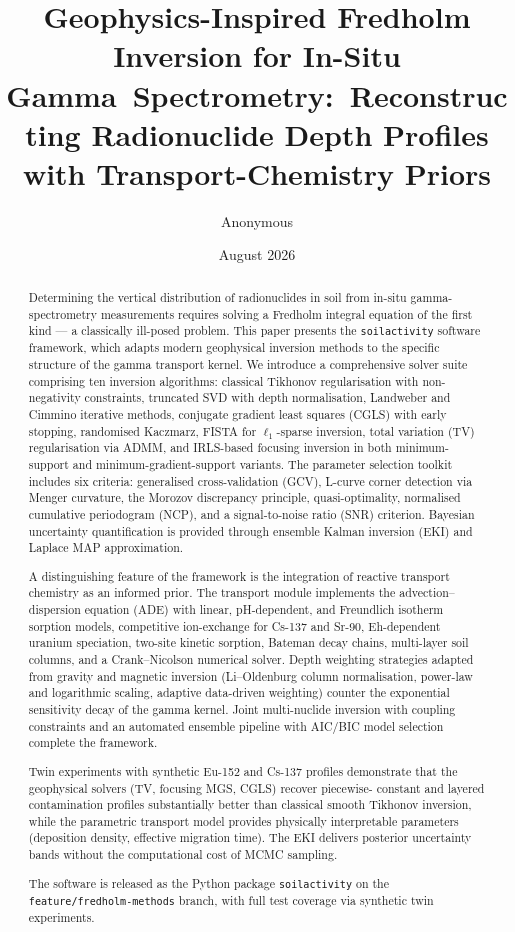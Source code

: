 \documentclass[a4paper,11pt]{article}
\title{
  Geophysics-Inspired Fredholm Inversion for In-Situ Gamma\ Spectrometry:\
  Reconstructing Radionuclide Depth Profiles with Transport-Chemistry Priors
}
\author{Anonymous}
\date{August 2026}
\begin{document}
\maketitle

\begin{abstract}
Determining the vertical distribution of radionuclides in soil from in-situ
gamma-spectrometry measurements requires solving a Fredholm integral
equation of the first kind --- a classically ill-posed problem.  This paper
presents the \texttt{soilactivity} software framework, which adapts modern
geophysical inversion methods to the specific structure of the gamma
transport kernel.  We introduce a comprehensive solver suite comprising
ten inversion algorithms: classical Tikhonov regularisation with
non-negativity constraints, truncated SVD with depth normalisation,
Landweber and Cimmino iterative methods, conjugate gradient least squares
(CGLS) with early stopping, randomised Kaczmarz, FISTA for
\(\ell_1\)-sparse inversion, total variation (TV) regularisation via ADMM,
and IRLS-based focusing inversion in both minimum-support and
minimum-gradient-support variants.  The parameter selection toolkit
includes six criteria: generalised cross-validation (GCV), L-curve corner
detection via Menger curvature, the Morozov discrepancy principle,
quasi-optimality, normalised cumulative periodogram (NCP), and a
signal-to-noise ratio (SNR) criterion.  Bayesian uncertainty quantification
is provided through ensemble Kalman inversion (EKI) and Laplace MAP
approximation.

A distinguishing feature of the framework is the integration of reactive
transport chemistry as an informed prior.  The transport module implements
the advection--dispersion equation (ADE) with linear, pH-dependent, and
Freundlich isotherm sorption models, competitive ion-exchange for
Cs-137 and Sr-90, Eh-dependent uranium speciation, two-site kinetic
sorption, Bateman decay chains, multi-layer soil columns, and a
Crank--Nicolson numerical solver.  Depth weighting strategies adapted
from gravity and magnetic inversion (Li--Oldenburg column normalisation,
power-law and logarithmic scaling, adaptive data-driven weighting) counter
the exponential sensitivity decay of the gamma kernel.  Joint multi-nuclide
inversion with coupling constraints and an automated ensemble pipeline
with AIC/BIC model selection complete the framework.

Twin experiments with synthetic Eu-152 and Cs-137 profiles demonstrate
that the geophysical solvers (TV, focusing MGS, CGLS) recover piecewise-
constant and layered contamination profiles substantially better than
classical smooth Tikhonov inversion, while the parametric transport model
provides physically interpretable parameters (deposition density,
effective migration time).  The EKI delivers posterior uncertainty bands
without the computational cost of MCMC sampling.

The software is released as the Python package \texttt{soilactivity} on
the \texttt{feature/fredholm-methods} branch, with full test coverage
via synthetic twin experiments.
\end{abstract}
\end{document}
